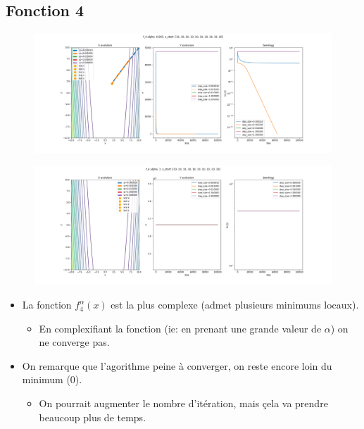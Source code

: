 \documentclass[twoside,10pt,a4paper]{article}
\numberwithin{equation}{section}					%
\numberwithin{figure}{section}						%
\begin{document}
\subsection{Fonction 4 }\label{sec:subsection2}
\begin{figure}[H]
    \centering
    \includegraphics[width=\textwidth]{imgs/fixed_sz/f_4_a-0.005_fixed_sz.png}
    \caption{}
\end{figure}
\begin{figure}[H]
    \centering
    \includegraphics[width=\textwidth]{imgs/fixed_sz/f_4_a-3_fixed_sz.png}
    \caption{}
\end{figure}
\begin{itemize}
	\item La fonction $f_4^{\alpha}(x)$ est la plus complexe (admet plusieurs minimums locaux).
	\begin{itemize}
    	\item En complexifiant la fonction (ie: en prenant une grande valeur de $\alpha$) on ne converge pas.
	\end{itemize}
	\item On remarque que l'agorithme peine à converger, on reste encore loin du minimum (0).
	\begin{itemize}
    	\item On pourrait augmenter le nombre d'itération, mais çela va prendre beaucoup plus de temps.
	\end{itemize}
\end{itemize}
\end{document}
